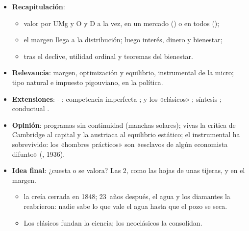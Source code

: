 \documentclass{article}
\begin{document}
\begin{columnas}
\begin{itemize}
\item \textbf{Recapitulación}:
  \begin{itemize}
  \item valor por UMg y O y D a la vez, en un mercado () o en todos ();
  \item el margen llega a la distribución; luego interés, dinero y bienestar;
  \item tras el declive, utilidad ordinal y teoremas del bienestar.
  \end{itemize}
\item \textbf{Relevancia}: margen, optimización y equilibrio, instrumental de la micro; tipo natural e impuesto pigouviano, en la política.
\item \textbf{Extensiones}: - ; competencia imperfecta ;  y los «clásicos» ; síntesis ; conductual .
\item \textbf{Opinión}: programas sin continuidad (manchas solares); vivas la crítica de Cambridge al capital y la austriaca al equilibrio estático; el instrumental ha sobrevivido: los «hombres prácticos» son «esclavos de algún economista difunto» (, 1936).
\item \textbf{Idea final}: ¿cuesta o se valora? Las 2, como las hojas de unas tijeras, y en el margen.
  \begin{itemize}
  \item {} la creía cerrada en 1848; 23~años después, el agua y los diamantes la reabrieron: nadie sabe lo que vale el agua hasta que el pozo se seca.
  \item Los clásicos fundan la ciencia; los neoclásicos la consolidan.
  \end{itemize}
\end{itemize}


\end{columnas}
\end{document}
